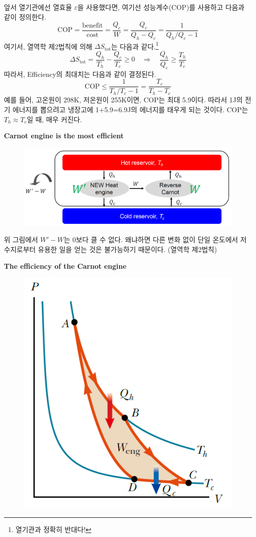 \documentclass{article}
\newcommand{\ve}{\varepsilon}
\begin{document}
\noindent
앞서 열기관에선 열효율 $\ve$을 사용했다면, 여기선 성능계수(COP)를 사용하고 다음과 같이 정의한다.
\begin{equation}
    \text{COP} = \frac{\text{benefit}}{\text{cost}} = \frac{Q_c}{W} = \frac{Q_c}{Q_h - Q_c} = \frac{1}{Q_h / Q_c - 1}
\end{equation}
여기서, 열역학 제2법칙에 의해 $\Delta S_\text{tot}$는 다음과 같다.\footnote{열기관과 정확히 반대다!}
\begin{equation}
    \Delta S_{\text{tot}} = \frac{Q_h}{T_h} - \frac{Q_c}{T_c}  \geq 0 \quad \Rightarrow \quad \frac{Q_h}{Q_c} \geq \frac{T_h}{T_c}
\end{equation}
따라서, Efficiency의 최대치는 다음과 같이 결정된다.
\begin{equation}
    \text{COP} \leq \frac{1}{T_h / T_c - 1} = \frac{T_c}{T_h - T_c}
\end{equation}
예를 들어, 고온원이 298K, 저온원이 255K이면, COP는 최대 5.9이다. 따라서 1J의 전기 에너지를 뽑으려고 냉장고에 1+5.9=6.9J의 에너지를 태우게 되는 것이다. COP는 $T_h \approx T_c$일 때, 매우 커진다.

\newpage

\noindent
\textbf{Carnot engine is the most efficient}

\begin{figure}[h]
    \centering
    \includegraphics[width=0.75\linewidth]{images/fig2_2.png}
\end{figure}

위 그림에서 $W' - W$는 0보다 클 수 없다. 왜냐하면 다른 변화 없이 단일 온도에서 저수지로부터 유용한 일을 얻는 것은 불가능하기 때문이다. (열역학 제2법칙)

\vspace{2mm} \noindent
\textbf{The efficiency of the Carnot engine}

\begin{figure}[h]
    \centering
    \includegraphics[width=0.4\linewidth]{images/fig2_3.png}
\end{figure}
\end{document}
